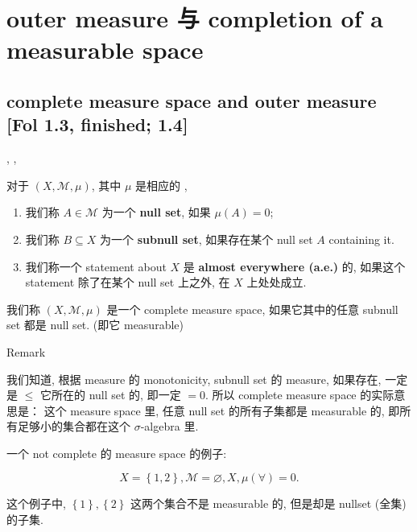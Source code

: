 \chapter{outer measure 与 completion of a measurable space}\label{outer-measure-ux4e0e-completion-of-a-measurable-space}

\section{complete measure space and outer measure {[}Fol 1.3, finished; 1.4{]}}

\begin{definition}{, , }

对于  \((X,\mathcal{M},\mu)\), 其中 \(\mu\) 是相应的 ,

\begin{enumerate}
\item
  我们称 \(A \in \mathcal{M}\) 为一个 \textbf{null set}, 如果 \(\mu(A) = 0\);
\item
  我们称 \(B \subseteq X\) 为一个 \textbf{subnull set}, 如果存在某个 null set \(A\) containing it.
\item
  我们称一个 statement about \(X\) 是 \textbf{almost everywhere (a.e.)} 的, 如果这个 statement 除了在某个 null set 上之外, 在 \(X\) 上处处成立.
\end{enumerate}

\end{definition}

\begin{definition}{}

我们称 \((X,\mathcal{M},\mu)\) 是一个 complete measure space, 如果它其中的任意 subnull set 都是 null set. (即它 measurable)

\end{definition}

\begin{qlremark}{Remark}

我们知道, 根据 measure 的 monotonicity, subnull set 的 measure, 如果存在, 一定是 \(\leq\) 它所在的 null set 的, 即一定 \(= 0\). 所以 complete measure space 的实际意思是： 这个 measure space 里, 任意 null set 的所有子集都是 measurable 的, 即所有足够小的集合都在这个 \(\sigma\)-algebra 里.

\end{qlremark}

\begin{example}

一个 not complete 的 measure space 的例子:

\[X = \left\{ {1,2} \right\},\mathcal{M} = \varnothing,X,\mu(\forall) = 0.\]

这个例子中, \(\left\{ 1 \right\},\left\{ 2 \right\}\) 这两个集合不是 measurable 的, 但是却是 nullset (全集) 的子集.

\end{example}

